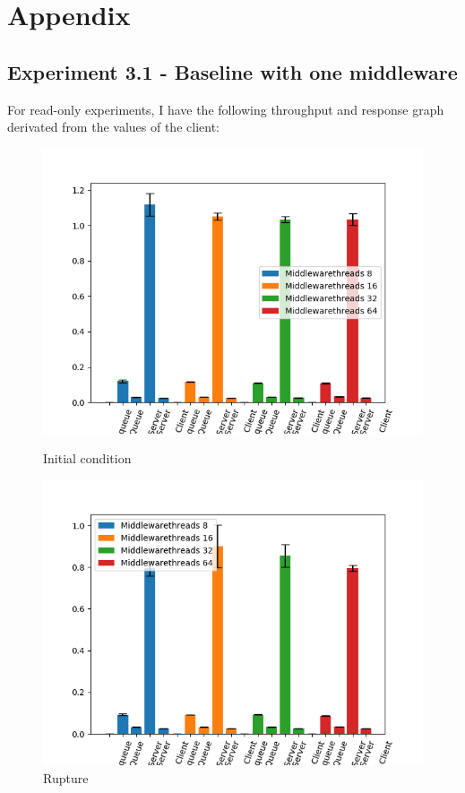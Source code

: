 \documentclass[11pt,a4paper]{article}
\begin{document}
\section{Appendix}

\subsection{Experiment 3.1 - Baseline with one middleware}
For read-only experiments, I have the following throughput and response graph derivated from the values of the client:

\begin{figure}[!ht] 
  \label{ fig7} 
  \begin{minipage}[b]{0.5\linewidth}
    \centering
    \includegraphics[width=0.7\linewidth]{img/exp3_1/exp3_1_mw_percentile_plots_writes_0__vc_1.png} 
    \caption{Initial condition} 
    \vspace{4ex}
  \end{minipage}%
  \begin{minipage}[b]{0.5\linewidth}
    \centering
    \includegraphics[width=0.7\linewidth]{img/exp3_1/exp3_1_mw_percentile_plots_writes_1__vc_1.png} 
    \caption{Rupture} 
    \vspace{4ex}

\end{minipage}
\end{figure}
\end{document}
